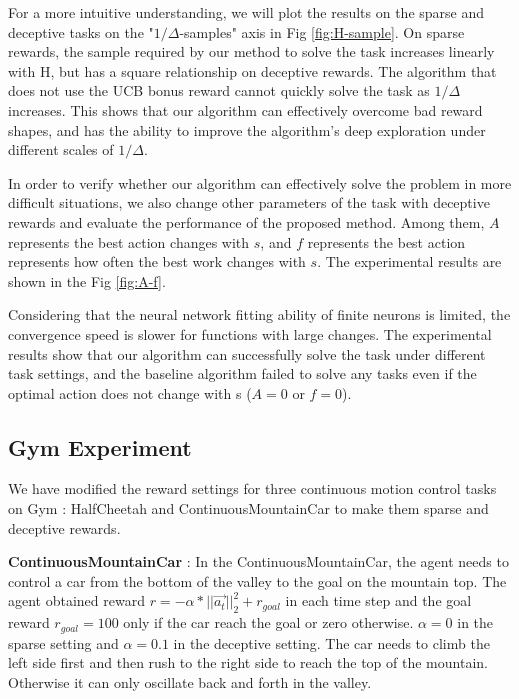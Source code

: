 For a more intuitive understanding, we will plot the results on the sparse and deceptive tasks on the "$1/\Delta$-samples" axis in Fig \ref{fig:H-sample}. On sparse rewards, the sample required by our method to solve the task increases linearly with H, but has a square relationship on deceptive rewards. The algorithm that does not use the UCB bonus reward cannot quickly solve the task as $1/\Delta$ increases. This shows that our algorithm can effectively overcome bad reward shapes, and has the ability to improve the algorithm's deep exploration under different scales of $1/\Delta$.

In order to verify whether our algorithm can effectively solve the problem in more difficult situations, we also change other parameters of the task with deceptive rewards and evaluate the performance of the proposed method. Among them, $ A $ represents the best action changes with $ s $, and $ f $ represents the best action represents how often the best work changes with $ s $. The experimental results are shown in the Fig \ref{fig:A-f}.

Considering that the neural network fitting ability of finite neurons is limited, the convergence speed is slower for functions with large changes. The experimental results show that our algorithm can successfully solve the task under different task settings, and the baseline algorithm failed to solve any tasks even if the optimal action does not change with s ($ A = 0 $ or $ f = 0 $).

\subsection{Gym Experiment}

We have modified the reward settings for three continuous motion control tasks on Gym \cite{gym}: HalfCheetah and ContinuousMountainCar to make them sparse and deceptive rewards. 

\textbf{ContinuousMountainCar} \cite{MC}: In the ContinuousMountainCar, the agent needs to control a car from the bottom of the valley to the goal on the mountain top. The agent obtained reward $r = -\alpha*||\vec{a_t}||^2_2 + r_{goal}$ in each time step and the goal reward $r_{goal}=100$ only if the car reach the goal or zero otherwise. $\alpha=0$ in the sparse setting and $\alpha=0.1$ in the deceptive setting. The car needs to climb the left side first and then rush to the right side to reach the top of the mountain. Otherwise it can only oscillate back and forth in the valley.

